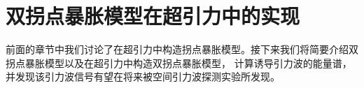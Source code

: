 \chapter{双拐点暴胀模型在超引力中的实现}

前面的章节中我们讨论了在超引力中构造拐点暴胀模型。接下来我们将简要介绍双拐点暴胀模型以及在超引力中构造双拐点暴胀模型，
计算诱导引力波的能量谱，并发现该引力波信号有望在将来被空间引力波探测实验所发现。



% 



